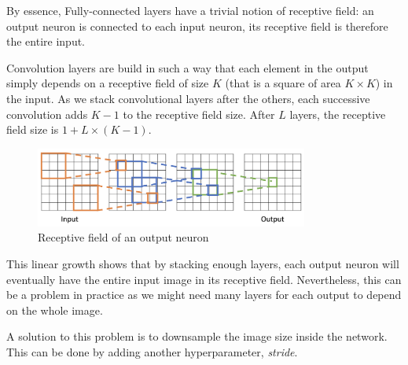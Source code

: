 By essence, Fully-connected layers have a trivial notion of receptive field: an output neuron is connected to each input neuron, its receptive field is therefore the entire input.

Convolution layers are build in such a way that each element in the output simply depends on a receptive field of size $K$ (that is a square of area $K\times K$) in the input. As we stack convolutional layers after the others, each successive convolution adds $K-1$ to the receptive field size. After $L$ layers, the receptive field size is $1+L\times(K-1)$. 

\begin{figure}[H]
    \centering
    \includegraphics[width=0.8\textwidth]{images/receptive-field.png}
    \caption{Receptive field of an output neuron}
\end{figure}

This linear growth shows that by stacking enough layers, each output neuron will eventually have the entire input image in its receptive field. Nevertheless, this can be a problem in practice as we might need many layers for each output to depend on the whole image.

A solution to this problem is to downsample the image size inside the network. This can be done by adding another hyperparameter, \emph{stride}.

